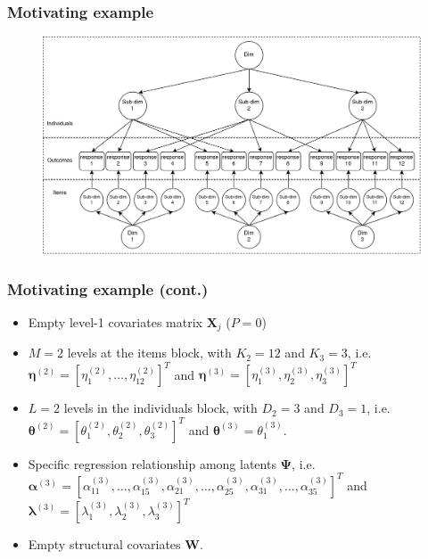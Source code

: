 \documentclass[arial,12pt,xcolor=dvipsnames]{beamer}
\begin{document}
\begin{frame}
	\frametitle{Motivating example}
	\begin{figure}[h]
		\centering
		\includegraphics[width=1\textwidth]{instrument_design}
		\label{fig:design}
	\end{figure}
\end{frame}
%
\begin{frame}
	\frametitle{Motivating example (cont.)}
	\begin{itemize}
		\item Empty level-1 covariates matrix $\mathbf{X}_{j}$ ($P=0$)
		\item $M=2$ levels at the items block, with $K_{2}=12$ and $K_{3}=3$, i.e. $\pmb{\eta}^{(2)} = [ \eta_{1}^{(2)}, \dots, \eta_{12}^{(2)} ]^{T}$ and $\pmb{\eta}^{(3)} = [ \eta_{1}^{(3)}, \eta_{2}^{(3)}, \eta_{3}^{(3)} ]^{T}$
		\item $L=2$ levels in the individuals block, with $D_{2}=3$ and $D_{3}=1$, i.e. $\pmb{\theta}^{(2)} = [ \theta_{1}^{(2)}, \theta_{2}^{(2)}, \theta_{3}^{(2)} ]^{T}$ and $\pmb{\theta}^{(3)} = \theta_{1}^{(3)}$.
		\item Specific regression relationship among latents $\pmb{\Psi}$, i.e.
		$ \pmb{\alpha}^{(3)} = [ \alpha_{11}^{(3)}, \dots, \alpha_{15}^{(3)}, \alpha_{21}^{(3)}, \dots, \alpha_{25}^{(3)}, \alpha_{31}^{(3)}, \dots, \alpha_{35}^{(3)} ]^{T} $ and  $ \pmb{\lambda}^{(3)} = [ \lambda_{1}^{(3)}, \lambda_{2}^{(3)}, \lambda_{3}^{(3)} ]^{T}$ 
		\item Empty structural covariates $\mathbf{W}$.
	\end{itemize}
\end{frame}
%
%
\end{document}
